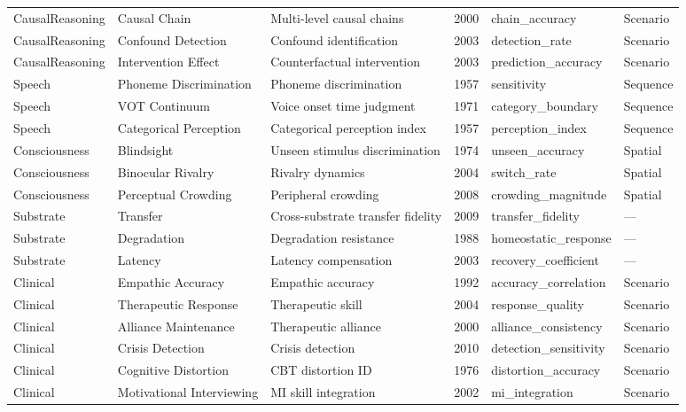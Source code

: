 \documentclass[10pt,landscape]{article}
\begin{document}
\begin{longtable}{@{}p{2.3cm}p{3.0cm}p{4.5cm}p{0.6cm}p{3.8cm}p{1.8cm}@{}}
\midrule
CausalReasoning & Causal Chain & Multi-level causal chains & 2000 & chain\_accuracy & Scenario \\
CausalReasoning & Confound Detection & Confound identification & 2003 & detection\_rate & Scenario \\
CausalReasoning & Intervention Effect & Counterfactual intervention & 2003 & prediction\_accuracy & Scenario \\

\midrule
Speech & Phoneme Discrimination & Phoneme discrimination & 1957 & sensitivity & Sequence \\
Speech & VOT Continuum & Voice onset time judgment & 1971 & category\_boundary & Sequence \\
Speech & Categorical Perception & Categorical perception index & 1957 & perception\_index & Sequence \\

\midrule
Consciousness & Blindsight & Unseen stimulus discrimination & 1974 & unseen\_accuracy & Spatial \\
Consciousness & Binocular Rivalry & Rivalry dynamics & 2004 & switch\_rate & Spatial \\
Consciousness & Perceptual Crowding & Peripheral crowding & 2008 & crowding\_magnitude & Spatial \\

\midrule
Substrate & Transfer & Cross-substrate transfer fidelity & 2009 & transfer\_fidelity & --- \\
Substrate & Degradation & Degradation resistance & 1988 & homeostatic\_response & --- \\
Substrate & Latency & Latency compensation & 2003 & recovery\_coefficient & --- \\

\midrule
Clinical & Empathic Accuracy & Empathic accuracy & 1992 & accuracy\_correlation & Scenario \\
Clinical & Therapeutic Response & Therapeutic skill & 2004 & response\_quality & Scenario \\
Clinical & Alliance Maintenance & Therapeutic alliance & 2000 & alliance\_consistency & Scenario \\
Clinical & Crisis Detection & Crisis detection & 2010 & detection\_sensitivity & Scenario \\
Clinical & Cognitive Distortion & CBT distortion ID & 1976 & distortion\_accuracy & Scenario \\
Clinical & Motivational Interviewing & MI skill integration & 2002 & mi\_integration & Scenario \\


\end{longtable}
\end{document}
